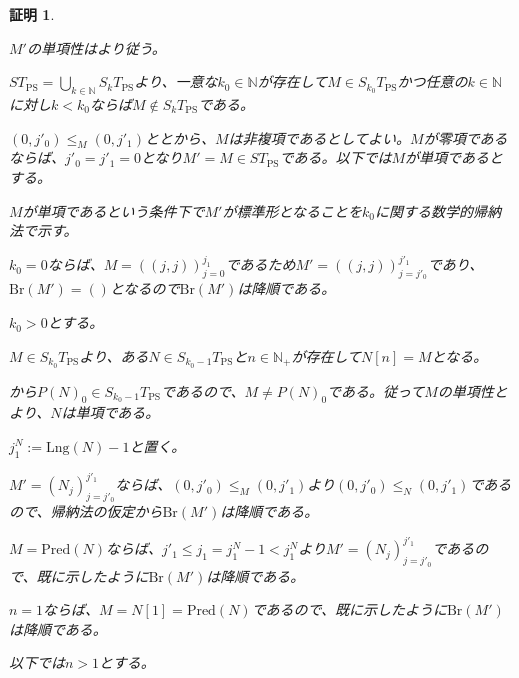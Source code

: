 \documentclass[dvipdfmx,uplatex]{jsarticle}
\theoremstyle{customnonumberbreakfortheorem}
\theoremstyle{customnonumberbreakforproof}
\newtheorem{hideableproof}{証明}
\begin{document}
\begin{hideableproof}
	\begin{indented}
		\item \(M'\)の単項性はより従う。
		\item \(ST_{\textrm{PS}} = \bigcup_{k \in \mathbb{N}} S_kT_{\textrm{PS}}\)より、一意な\(k_0 \in \mathbb{N}\)が存在して\(M \in S_{k_0}T_{\textrm{PS}}\)かつ任意の\(k \in \mathbb{N}\)に対し\(k < k_0\)ならば\(M \notin S_kT_{\textrm{PS}}\)である。
		\item \((0,j'_0) \leq_M (0,j'_1)\)ととから、\(M\)は非複項であるとしてよい。\(M\)が零項であるならば、\(j'_0 = j'_1 = 0\)となり\(M' = M \in ST_{\textrm{PS}}\)である。以下では\(M\)が単項であるとする。
		\item
		\item \(M\)が単項であるという条件下で\(M'\)が標準形となることを\(k_0\)に関する数学的帰納法で示す。
		\item \(k_0 = 0\)ならば、\(M = ((j,j))_{j=0}^{j_1}\)であるため\(M' = ((j,j))_{j=j'_0}^{j'_1}\)であり、\(\textrm{Br}(M') = ()\)となるので\(\textrm{Br}(M')\)は降順である。
		\item \(k_0 > 0\)とする。
		\begin{indented}
			\item \(M \in S_{k_0}T_{\textrm{PS}}\)より、ある\(N \in S_{k_0-1}T_{\textrm{PS}}\)と\(n \in \mathbb{N}_{+}\)が存在して\(N[n] = M\)となる。
			\item {}から\(P(N)_0 \in S_{k_0-1}T_{\textrm{PS}}\)であるので、\(M \neq P(N)_0\)である。従って\(M\)の単項性とより、\(N\)は単項である。
			\item \(j_1^N := \textrm{Lng}(N)-1\)と置く。
			\item
			\item \(M' = (N_j)_{j=j'_0}^{j'_1}\)ならば、\((0,j'_0) \leq_M (0,j'_1)\)より\((0,j'_0) \leq_N (0,j'_1)\)であるので、帰納法の仮定から\(\textrm{Br}(M')\)は降順である。
			\item \(M = \textrm{Pred}(N)\)ならば、\(j'_1 \leq j_1 = j_1^N-1 < j_1^N\)より\(M' = (N_j)_{j=j'_0}^{j'_1}\)であるので、既に示したように\(\textrm{Br}(M')\)は降順である。
			\item \(n = 1\)ならば、\(M = N[1] = \textrm{Pred}(N)\)であるので、既に示したように\(\textrm{Br}(M')\)は降順である。
			\item
			\item 以下では\(n > 1\)とする。

\end{indented}
\end{indented}
\end{hideableproof}
\end{document}
